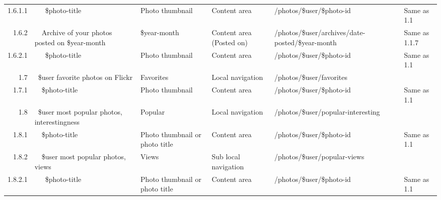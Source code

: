 \documentclass[12pt,a4paper]{article}
\begin{document}
\begin{landscape}
\begin{table}[h!b!p!]
\begin{center}
\begin{tiny}
\begin{tabular}{r|l|l|l|l|p{3cm}}
                  1.6.1.1 &
                  ~~~\$photo-title &
                  Photo thumbnail &
                  Content area &
                  /photos/\$user/\$photo-id &
                  Same as 1.1 \\

                1.6.2 &
                ~~Archive of your photos posted on \$year-month &
                \$year-month &
                Content area (Posted on) &
                /photos/\$user/archives/date-posted/\$year-month &
                Same as 1.1.7 \\

                  1.6.2.1 &
                  ~~~\$photo-title &
                  Photo thumbnail &
                  Content area &
                  /photos/\$user/\$photo-id &
                  Same as 1.1 \\

              1.7 &
              ~\$user favorite photos on Flickr &
              Favorites &
              Local navigation &
              /photos/\$user/favorites &
              \\

                1.7.1 &
                ~~\$photo-title &
                Photo thumbnail &
                Content area &
                /photos/\$user/\$photo-id &
                Same as 1.1 \\

              1.8 &
              ~\$user most popular photos, interestingness &
              Popular &
              Local navigation &
              /photos/\$user/popular-interesting &
              \\

                1.8.1 &
                ~~\$photo-title &
                Photo thumbnail or photo title &
                Content area &
                /photos/\$user/\$photo-id &
                Same as 1.1 \\

                1.8.2 &
                ~~\$user most popular photos, views &
                Views &
                Sub local navigation &
                /photos/\$user/popular-views &
                \\

                  1.8.2.1 &
                  ~~~\$photo-title &
                  Photo thumbnail or photo title &
                  Content area &
                  /photos/\$user/\$photo-id &
                  Same as 1.1 \\


\end{tabular}
\end{tiny}
\end{center}
\end{table}
\end{landscape}
\end{document}
